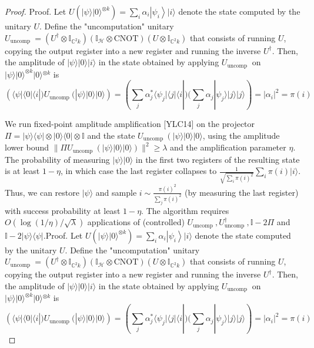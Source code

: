 \begin{proof}
	Proof. Let $U\left(|\psi\rangle|0\rangle^{\otimes k}\right)=\sum_i \alpha_i\left|\psi_i\right\rangle|i\rangle$ denote the state computed by the unitary $U$. Define the "uncomputation" unitary $U_{\text {uncomp }}=\left(U^{\dagger} \otimes \mathbb{I}_{\mathbb{C}^2 k}\right)\left(\mathbb{I}_{\mathcal{H}} \otimes \mathrm{CNOT}\right)\left(U \otimes \mathbb{I}_{\mathbb{C}^2 k}\right)$ that consists of running $U$, copying the output register into a new register and running the inverse $U^{\dagger}$. Then, the amplitude of $|\psi\rangle|0\rangle|i\rangle$ in the state obtained by applying $U_{\text {uncomp }}$ on $|\psi\rangle|0\rangle^{\otimes k}|0\rangle{ }^{\otimes k}$ is
$$
(\langle\psi |\langle0|\langle i|) U_{\text {uncomp }}(|\psi\rangle|0\rangle|0\rangle)=(\sum _ { j } \alpha _ { j } ^ { * } \langle\psi _ { j } |\langle j|\langle i|)(\sum_j \alpha_j|\psi_j\rangle|j\rangle|j\rangle)=|\alpha_i|^2=\pi(i) 
$$

We run fixed-point amplitude amplification [YLC14] on the projector $\Pi=|\psi\rangle\langle\psi|\otimes| 0\rangle\langle 0| \otimes \mathbb{I}$ and the state $U_{\text {uncomp }}\left(|\psi\rangle|0\rangle|0\rangle\right.$, using the amplitude lower bound $\| \Pi U_{\text {uncomp }}(|\psi\rangle|0\rangle|0\rangle) \|^2 \geq \lambda$ and the amplification parameter $\eta$. The probability of measuring $|\psi\rangle|0\rangle$ in the first two registers of the resulting state is at least $1-\eta$, in which case the last register collapses to $\frac{1}{\sqrt{\sum_i \pi(i)^2}} \sum_i \pi(i)|i\rangle$. Thus, we can restore $|\psi\rangle$ and sample $i \sim \frac{\pi(i)^2}{\sum_j \pi(i)^2}$ (by measuring the last register) with success probability at least $1-\eta$. The algorithm requires $O(\log (1 / \eta) / \sqrt{\lambda})$ applications of (controlled) $U_{\text {uncomp }}, U_{\text {uncomp }}^{\dagger}, \mathbb{I}-2 \Pi$ and $\mathbb{I}-2|\psi\rangle\langle\psi|$.Proof. Let $U\left(|\psi\rangle|0\rangle^{\otimes k}\right)=\sum_i \alpha_i\left|\psi_i\right\rangle|i\rangle$ denote the state computed by the unitary $U$. Define the "uncomputation" unitary $U_{\text {uncomp }}=\left(U^{\dagger} \otimes \mathbb{I}_{\mathbb{C}^2 k}\right)\left(\mathbb{I}_{\mathcal{H}} \otimes \mathrm{CNOT}\right)\left(U \otimes \mathbb{I}_{\mathbb{C}^2 k}\right)$ that consists of running $U$, copying the output register into a new register and running the inverse $U^{\dagger}$. Then, the amplitude of $|\psi\rangle|0\rangle|i\rangle$ in the state obtained by applying $U_{\text {uncomp }}$ on $|\psi\rangle|0\rangle^{\otimes k}|0\rangle{ }^{\otimes k}$ is
	$$
	(\langle\psi | \langle0| \langle i|) U_{\text {uncomp }}(|\psi\rangle|0\rangle|0\rangle)=(\sum _ { j } \alpha _ { j } ^ { * } \langle\psi _ { j } |\langle j|\langle i|)(\sum_j \alpha_j|\psi_j\rangle|j\rangle|j\rangle)=|\alpha_i |^2=\pi(i) 
	$$
	

\end{proof}
